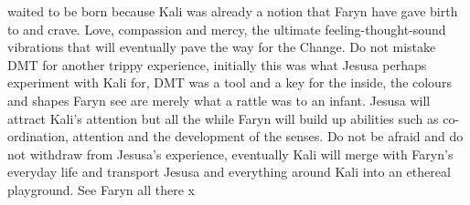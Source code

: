 \documentclass[12pt]{book}
\begin{document}
waited to be born because Kali was already a notion that Faryn have gave birth to and crave. Love, compassion and mercy, the ultimate feeling-thought-sound vibrations that will eventually pave the way for the Change. Do not mistake DMT for another trippy experience, initially this was what Jesusa perhaps experiment with Kali for, DMT was a tool and a key for the inside, the colours and shapes Faryn see are merely what a rattle was to an infant. Jesusa will attract Kali's attention but all the while Faryn will build up abilities such as co-ordination, attention and the development of the senses. Do not be afraid and do not withdraw from Jesusa's experience, eventually Kali will merge with Faryn's everyday life and transport Jesusa and everything around Kali into an ethereal playground. See Faryn all there x
\end{document}
